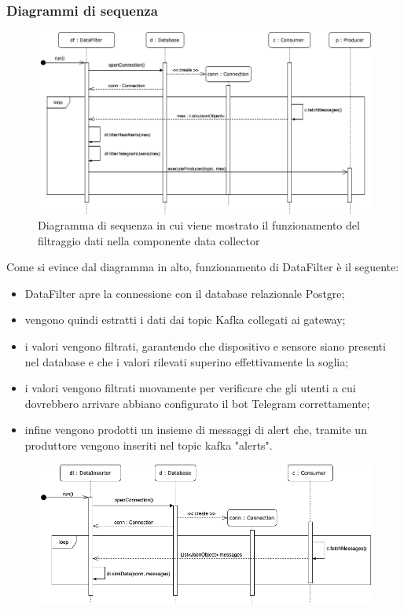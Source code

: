 		\begin{landscape}
		\subsubsection{Diagrammi di sequenza}%
			\begin{figure}[H]
				\centering
				\includegraphics[scale=0.550]{res/images/DATACOLLECTOR/DataFilter.ThreadsKafkaDataCollector.png}
				\caption{Diagramma di sequenza in cui viene mostrato il funzionamento del filtraggio dati nella componente data collector}
				\label{Diagramma 7}
			\end{figure}
			Come si evince dal diagramma in alto, funzionamento di DataFilter è il seguente:
			\begin{itemize}
				\item DataFilter apre la connessione con il database relazionale Postgre;
				\item vengono quindi estratti i dati dai topic Kafka collegati ai gateway;
				\item i valori vengono filtrati, garantendo che dispositivo e sensore siano presenti nel database e che i valori rilevati superino effettivamente la soglia;
				\item i valori vengono filtrati nuovamente per verificare che gli utenti a cui dovrebbero arrivare abbiano configurato il bot Telegram correttamente;
				\item infine vengono prodotti un insieme di messaggi di alert che, tramite un produttore vengono inseriti nel topic kafka "alerts". 
			\end{itemize}
			\begin{figure}[H]
				\centering
				\includegraphics[scale=0.550]{res/images/DATACOLLECTOR/DataInserter.ThreadsKafkaDataCollector.png}

\end{figure}
\end{landscape}
